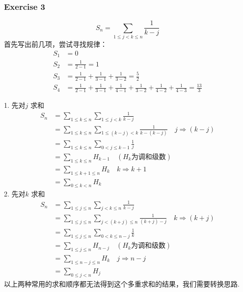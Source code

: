 \subsubsection{Exercise 3}
\begin{equation*}
    S_n = \sum_{1\leqslant j < k\leqslant n}\frac{1}{k-j}
\end{equation*}
首先写出前几项，尝试寻找规律：
\begin{align*}
    S_1 &= 0\\
    S_2 &= \frac{1}{2-1} = 1\\
    S_3 &= \frac{1}{2-1}+\frac{1}{3-1}+\frac{1}{3-2} = \frac{5}{2}\\
    S_4 &= \frac{1}{2-1}+\frac{1}{3-1}+\frac{1}{4-1}+\frac{1}{3-2}+\frac{1}{4-2}+\frac{1}{4-3} = \frac{13}{3}
\end{align*}
\begin{solve}
    1. 先对$ j $ 求和
    \begin{align*}
        S_n 
        &= \sum_{1\leqslant k \leqslant n} \sum_{1\leqslant j < k}\frac{1}{k-j}\\
        &= \sum_{1\leqslant k \leqslant n} \sum_{1\leqslant (k-j) < k}\frac{1}{k-(k-j)} \quad j\Rightarrow (k-j) \\
        &= \sum_{1\leqslant k \leqslant n} \sum_{0<j\leqslant k-1}\frac{1}{j} \\
        &= \sum_{1\leqslant k \leqslant n} H_{k-1} \quad(H_k\text{为调和级数})\\
        &= \sum_{1\leqslant k+1 \leqslant n} H_{k}\quad k\Rightarrow k+1 \\
        &= \sum_{0\leqslant k < n} H_{k}
    \end{align*}
    2. 先对$ k $ 求和
    \begin{align*}
        S_n 
        &= \sum_{1\leqslant j \leqslant n} \sum_{j < k\leqslant n}\frac{1}{k-j}\\
        &= \sum_{1\leqslant j \leqslant n} \sum_{j < (k+j)\leqslant n}\frac{1}{(k+j)-j} \quad k\Rightarrow (k+j) \\
        &= \sum_{1\leqslant j \leqslant n} \sum_{0<k\leqslant n-j}\frac{1}{k} \\
        &= \sum_{1\leqslant j \leqslant n} H_{n-j} \quad(H_k\text{为调和级数})\\
        &= \sum_{1\leqslant n-j \leqslant n} H_{k}\quad j\Rightarrow n-j \\
        &= \sum_{0\leqslant j < n} H_{j}
    \end{align*}
    以上两种常用的求和顺序都无法得到这个多重求和的结果，我们需要转换思路.


\end{solve}
